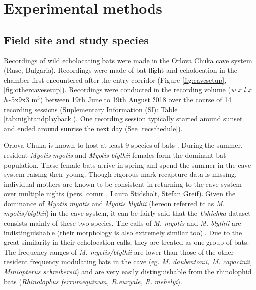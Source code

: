 \documentclass[
]{book}
\begin{document}
\hypertarget{experimental-methods}{%
\section{Experimental methods}\label{experimental-methods}}

\hypertarget{field-site-and-study-species}{%
\subsection{Field site and study species}\label{field-site-and-study-species}}

Recordings of wild echolocating bats were made in the Orlova Chuka cave system (Ruse, Bulgaria). Recordings were made of bat flight and echolocation in the chamber first encountered after the entry corridor (Figure \ref{fig:cavesetup}, \ref{fig:othercavesetup}). Recordings were conducted in the recording volume (\emph{w x l x h}\textasciitilde5x9x3 m\(^{3}\)) between 19th June to 19th August 2018 over the course of 14 recording sessions (Suplementary Information (SI): Table \ref{tab:nightandplayback}). One recording session typically started around sunset and ended around sunrise the next day (See \ref{recschedule}).

Orlova Chuka is known to host at least 9 species of bats \citep{Ivanova2005, govtbatcount}. During the summer, resident \emph{Myotis myotis} and \emph{Myotis blythii} females form the dominant bat population. These female bats arrive in spring and spend the summer in the cave system raising their young. Though rigorous mark-recapture data is missing, individual mothers are known to be consistent in returning to the cave system over multiple nights (pers. comm., Laura Stidsholt, Stefan Greif). Given the dominance of \emph{Myotis myotis} and \emph{Myotis blythii} (hereon referred to as \emph{M. myotis/blythii}) in the cave system, it can be fairly said that the \emph{Ushichka} dataset consists mainly of these two species. The calls of \emph{M. myotis} and \emph{M. blythii} are indistinguishable (their morphology is also extremely similar too) \citep{dietz2016bats}. Due to the great similarity in their echolocation calls, they are treated as one group of bats. The frequency ranges of \emph{M. myotis/blythii} are lower than those of the other resident frequency modulating bats in the cave (eg. \emph{M. daubentonii, M. capacinii, Miniopterus schreibersii}) and are very easily distinguishable from the rhinolophid bats (\emph{Rhinolophus ferrumequinum, R.euryale, R. mehelyi})\citep{dietz2016bats}.
\end{document}
